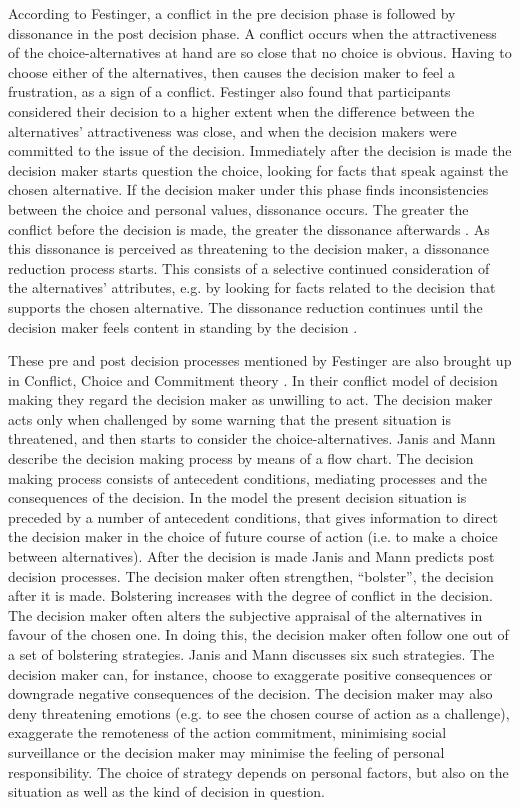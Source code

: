 According to Festinger, a conflict in the pre decision phase is
followed by dissonance in the post decision phase.  A conflict occurs
when the attractiveness of the choice-alternatives at hand are so
close that no choice is obvious.  Having to choose either of the
alternatives, then causes the decision maker to feel a frustration, as
a sign of a conflict.  Festinger also found that participants
considered their decision to a higher extent when the difference
between the alternatives' attractiveness was close, and when the
decision makers were committed to the issue of the decision.
Immediately after the decision is made the decision maker starts
question the choice, looking for facts that speak against the chosen
alternative.  If the decision maker under this phase finds
inconsistencies between the choice and personal values, dissonance
occurs.  The greater the conflict before the decision is made, the
greater the dissonance afterwards \parencite{festinger64}.  As this
dissonance is perceived as threatening to the decision maker, a
dissonance reduction process starts.  This consists of a selective
continued consideration of the alternatives' attributes, e.g. by
looking for facts related to the decision that supports the chosen
alternative.  The dissonance reduction continues until the decision
maker feels content in standing by the decision
\parencite{festinger64}.

These pre and post decision processes mentioned by Festinger
\parencite{festinger64} are also brought up in Conflict, Choice and
Commitment theory \parencite{JanisMann77}.  In their conflict model of
decision making they regard the decision maker as unwilling to act.
The decision maker acts only when challenged by some warning that the
present situation is threatened, and then starts to consider the
choice-alternatives.  Janis and Mann describe the decision making
process by means of a flow chart.  The decision making process
consists of antecedent conditions, mediating processes and the
consequences of the decision.  In the model the present decision
situation is preceded by a number of antecedent conditions, that gives
information to direct the decision maker in the choice of future
course of action (i.e.  to make a choice between alternatives).  After
the decision is made Janis and Mann predicts post decision processes.
The decision maker often strengthen, ``bolster'', the decision after it
is made.  Bolstering increases with the degree of conflict in the
decision.  The decision maker often alters the subjective appraisal of
the alternatives in favour of the chosen one.  In doing this, the
decision maker often follow one out of a set of bolstering strategies.
Janis and Mann discusses six such strategies.  The decision maker can,
for instance, choose to exaggerate positive consequences or downgrade
negative consequences of the decision.  The decision maker may also
deny threatening emotions (e.g. to see the chosen course of action as
a challenge), exaggerate the remoteness of the action commitment,
minimising social surveillance or the decision maker may minimise the
feeling of personal responsibility.  The choice of strategy depends on
personal factors, but also on the situation as well as the kind of
decision in question.

